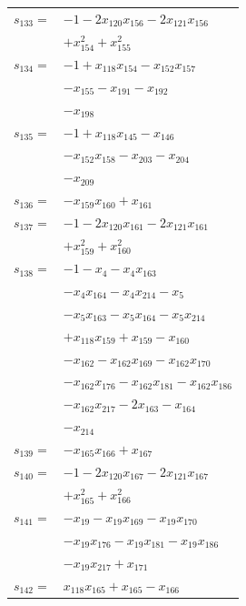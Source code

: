 \begin{longtable}{@{}r@{\;}l@{}}
\(s_{133}=\) & \(\displaystyle -1 -2x_{120}x_{156} -2x_{121}x_{156}\) \\
 & \(\displaystyle +x_{154}^{2} +x_{155}^{2}\) \\[3pt]
\(s_{134}=\) & \(\displaystyle -1 +x_{118}x_{154} -x_{152}x_{157}\) \\
 & \(\displaystyle -x_{155} -x_{191} -x_{192}\) \\
 & \(\displaystyle -x_{198}\) \\[3pt]
\(s_{135}=\) & \(\displaystyle -1 +x_{118}x_{145} -x_{146}\) \\
 & \(\displaystyle -x_{152}x_{158} -x_{203} -x_{204}\) \\
 & \(\displaystyle -x_{209}\) \\[3pt]
\(s_{136}=\) & \(\displaystyle -x_{159}x_{160} +x_{161}\) \\[3pt]
\(s_{137}=\) & \(\displaystyle -1 -2x_{120}x_{161} -2x_{121}x_{161}\) \\
 & \(\displaystyle +x_{159}^{2} +x_{160}^{2}\) \\[3pt]
\(s_{138}=\) & \(\displaystyle -1 -x_{4} -x_{4}x_{163}\) \\
 & \(\displaystyle -x_{4}x_{164} -x_{4}x_{214} -x_{5}\) \\
 & \(\displaystyle -x_{5}x_{163} -x_{5}x_{164} -x_{5}x_{214}\) \\
 & \(\displaystyle +x_{118}x_{159} +x_{159} -x_{160}\) \\
 & \(\displaystyle -x_{162} -x_{162}x_{169} -x_{162}x_{170}\) \\
 & \(\displaystyle -x_{162}x_{176} -x_{162}x_{181} -x_{162}x_{186}\) \\
 & \(\displaystyle -x_{162}x_{217} -2x_{163} -x_{164}\) \\
 & \(\displaystyle -x_{214}\) \\[3pt]
\(s_{139}=\) & \(\displaystyle -x_{165}x_{166} +x_{167}\) \\[3pt]
\(s_{140}=\) & \(\displaystyle -1 -2x_{120}x_{167} -2x_{121}x_{167}\) \\
 & \(\displaystyle +x_{165}^{2} +x_{166}^{2}\) \\[3pt]
\(s_{141}=\) & \(\displaystyle -x_{19} -x_{19}x_{169} -x_{19}x_{170}\) \\
 & \(\displaystyle -x_{19}x_{176} -x_{19}x_{181} -x_{19}x_{186}\) \\
 & \(\displaystyle -x_{19}x_{217} +x_{171}\) \\[3pt]
\(s_{142}=\) & \(\displaystyle x_{118}x_{165} +x_{165} -x_{166}\) \\

\end{longtable}
